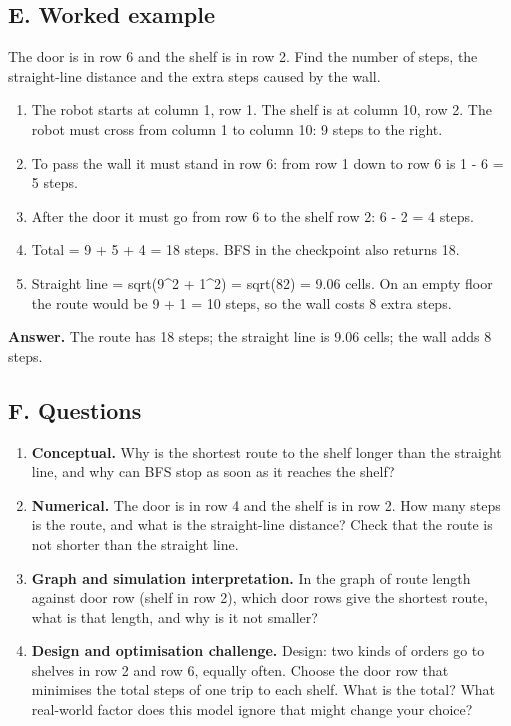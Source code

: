 \documentclass[11pt,a4paper]{article}
\begin{document}
\subsection*{E. Worked example}
The door is in row 6 and the shelf is in row 2. Find the number of steps, the straight-line distance and the extra steps caused by the wall.
\begin{enumerate}[nosep]
\item The robot starts at column 1, row 1. The shelf is at column 10, row 2. The robot must cross from column 1 to column 10: 9 steps to the right.
\item To pass the wall it must stand in row 6: from row 1 down to row 6 is \textbar{}1 - 6\textbar{} = 5 steps.
\item After the door it must go from row 6 to the shelf row 2: \textbar{}6 - 2\textbar{} = 4 steps.
\item Total = 9 + 5 + 4 = 18 steps. BFS in the checkpoint also returns 18.
\item Straight line = sqrt(9\textasciicircum{}2 + 1\textasciicircum{}2) = sqrt(82) = 9.06 cells. On an empty floor the route would be 9 + 1 = 10 steps, so the wall costs 8 extra steps.
\end{enumerate}
\textbf{Answer.} The route has 18 steps; the straight line is 9.06 cells; the wall adds 8 steps.

\subsection*{F. Questions}
\begin{enumerate}[nosep]
\item \textbf{Conceptual.} Why is the shortest route to the shelf longer than the straight line, and why can BFS stop as soon as it reaches the shelf?
\item \textbf{Numerical.} The door is in row 4 and the shelf is in row 2. How many steps is the route, and what is the straight-line distance? Check that the route is not shorter than the straight line.
\item \textbf{Graph and simulation interpretation.} In the graph of route length against door row (shelf in row 2), which door rows give the shortest route, what is that length, and why is it not smaller?
\item \textbf{Design and optimisation challenge.} Design: two kinds of orders go to shelves in row 2 and row 6, equally often. Choose the door row that minimises the total steps of one trip to each shelf. What is the total? What real-world factor does this model ignore that might change your choice?
\end{enumerate}
\end{document}

